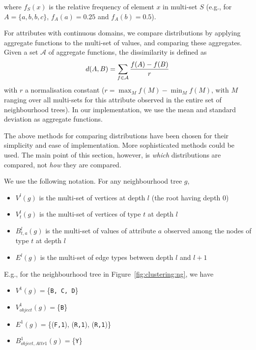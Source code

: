 \noindent where $f_S(x)$ is the relative frequency of element $x$ in multi-set $S$ (e.g., for $A=\{a,b,b,c\}$, $f_A(a)=0.25$ and $f_A(b)=0.5$).


For attributes with continuous domains, we compare distributions by applying aggregate functions to the multi-set of values, and comparing these aggregates.
Given a set $\mathcal{A}$ of aggregate functions, the dissimilarity is defined as
\begin{equation}
    d(A,B) = \sum_{f \in \mathcal{A}} {f(A)-f(B) \over r }
\end{equation}
with $r$ a normalisation constant ($r = \max_M f(M) - \min_M f(M)$, with $M$ ranging over all multi-sets for this attribute observed in the entire set of neighbourhood trees).
In our implementation, we use the mean and standard deviation as aggregate functions.


The above methods for comparing distributions have been chosen for their simplicity and ease of implementation.  More sophisticated methods could be used.
The main point of this section, however, is {\em which} distributions are compared, not {\em how} they are compared.


We use the following notation.  For any neighbourhood tree $g$,
\begin{itemize}
\item[\textbullet] $V^l(g)$ is the multi-set of vertices at depth $l$ (the root having depth 0)
\item[\textbullet] $V^l_t(g)$ is the multi-set of vertices of type $t$ at depth $l$
\item[\textbullet] $B^l_{t,a}(g)$ is the multi-set of values of attribute $a$ observed among the nodes of type $t$ at depth $l$
\item[\textbullet] $E^l(g)$ is the multi-set of edge types between depth $l$ and $l+1$
\end{itemize}

E.g., for the neighbourhood tree in Figure~\ref{fig:clustering:ng}, we have
\begin{itemize}
    \item[\textbullet] $V^1(g) = $\{\texttt{B, C, D}\}
    \item[\textbullet] $V^1_{object}(g) = $\{\texttt{B}\}
    \item[\textbullet] $E^1(g) = $\{(\texttt{F,1}), (\texttt{R,1}), (\texttt{R,1})\}
    \item[\textbullet] $B^1_{object,Attr1}(g) = $\{\texttt{Y}\}
\end{itemize}






